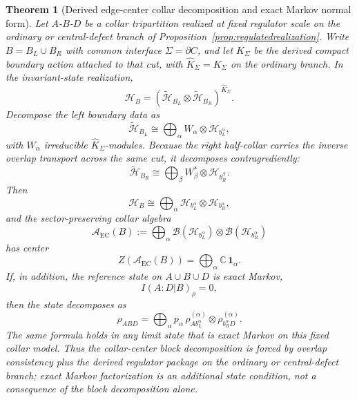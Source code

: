 \documentclass[11pt]{article}
\newtheorem{theorem}{Theorem}[section]
\begin{document}
\begin{theorem}[Derived edge-center collar decomposition and exact Markov normal form]\label{thm:markovcollar}
Let \(A\)-\(B\)-\(D\) be a collar tripartition realized at fixed regulator scale on the ordinary or central-defect branch of Proposition~\ref{prop:regulatedrealization}. Write \(B=B_L\cup B_R\) with common interface \(\Sigma=\partial C\), and let \(\widehat K_\Sigma\) be the derived compact boundary action attached to that cut, with \(\widehat K_\Sigma=K_\Sigma\) on the ordinary branch. In the invariant-state realization,
\[
\mathcal H_B=(\tilde{\mathcal H}_{B_L}\otimes \tilde{\mathcal H}_{B_R})^{\widehat K_\Sigma}.
\]
Decompose the left boundary data as
\[
\tilde{\mathcal H}_{B_L}\cong \bigoplus_\alpha W_\alpha\otimes \mathcal H_{b_L^\alpha},
\]
with \(W_\alpha\) irreducible \(\widehat K_\Sigma\)-modules. Because the right half-collar carries the inverse overlap transport across the same cut, it decomposes contragrediently:
\[
\tilde{\mathcal H}_{B_R}\cong \bigoplus_\beta W_\beta^*\otimes \mathcal H_{b_R^\beta}.
\]
Then
\[
\mathcal H_B\cong\bigoplus_\alpha \mathcal H_{b_L^\alpha}\otimes \mathcal H_{b_R^\alpha},
\]
and the sector-preserving collar algebra
\[
\mathcal A_{\mathrm{EC}}(B):=\bigoplus_\alpha \mathcal B(\mathcal H_{b_L^\alpha})\otimes \mathcal B(\mathcal H_{b_R^\alpha})
\]
has center
\[
Z(\mathcal A_{\mathrm{EC}}(B))=\bigoplus_\alpha \mathbb C\,\mathbf 1_\alpha.
\]
If, in addition, the reference state on \(A\cup B\cup D\) is exact Markov,
\[
I(A:D|B)_\rho=0,
\]
then the state decomposes as
\[
\rho_{ABD}
=
\bigoplus_\alpha p_\alpha\,
\rho^{(\alpha)}_{A b_L^\alpha}\otimes \rho^{(\alpha)}_{b_R^\alpha D}.
\]
The same formula holds in any limit state that is exact Markov on this fixed collar model.
Thus the collar-center block decomposition is forced by overlap consistency plus the derived regulator package on the ordinary or central-defect branch; exact Markov factorization is an additional state condition, not a consequence of the block decomposition alone.
\end{theorem}
\end{document}
